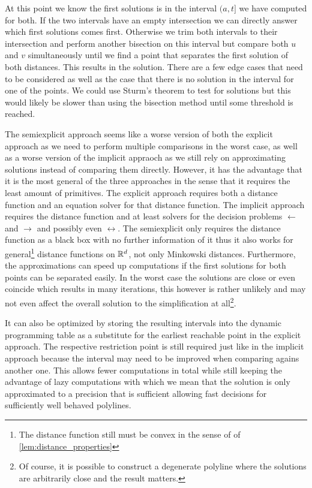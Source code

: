 At this point we know the first solutions is in the interval \((a, t]\) we have computed for both. If the two intervals have an empty intersection we can directly answer which first solutions comes first. Otherwise we trim both intervals to their intersection and perform another bisection on this interval but compare both \(u\) and \(v\) simultaneously until we find a point that separates the first solution of both distances. This results in the solution. There are a few edge cases that need to be considered as well as the case that there is no solution in the interval for one of the points. We could use Sturm's theorem to test for solutions but this would likely be slower than using the bisection method until some threshold is reached.

The semiexplicit approach seems like a worse version of both the explicit approach as we need to perform multiple comparisons in the worst case, as well as a worse version of the implicit appraoch as we still rely on approximating solutions instead of comparing them directly. However, it has the advantage that it is the most general of the three approaches in the sense that it requires the least amount of primitives. The explicit approach requires both a distance function and an equation solver for that distance function. The implicit approach requires the distance function and at least solvers for the decision problems \(\leftarrow\) and \(\rightarrow\) and possibly even \(\leftrightarrow\). The semiexplicit only requires the distance function as a black box with no further information of it thus it also works for general\footnote{The distance function still must be convex in the sense of of \cref{lem:distance_properties}} distance functions on \(\mathbb{R}^d\), not only Minkowski distances. Furthermore, the approximations can speed up computations if the first solutions for both points can be separated easily. In the worst case the solutions are close or even coincide which results in many iterations, this however is rather unlikely and may not even affect the overall solution to the simplification at all\footnote{Of course, it is possible to construct a degenerate polyline where the solutions are arbitrarily close and the result matters.}.

It can also be optimized by storing the resulting intervals into the dynamic programming table as a substitute for the earliest reachable point in the explicit approach. The respective restriction point is still required just like in the implicit approach because the interval may need to be improved when comparing agains another one. This allows fewer computations in total while still keeping the advantage of lazy computations with which we mean that the solution is only approximated to a precision that is sufficient allowing fast decisions for sufficiently well behaved polylines.

